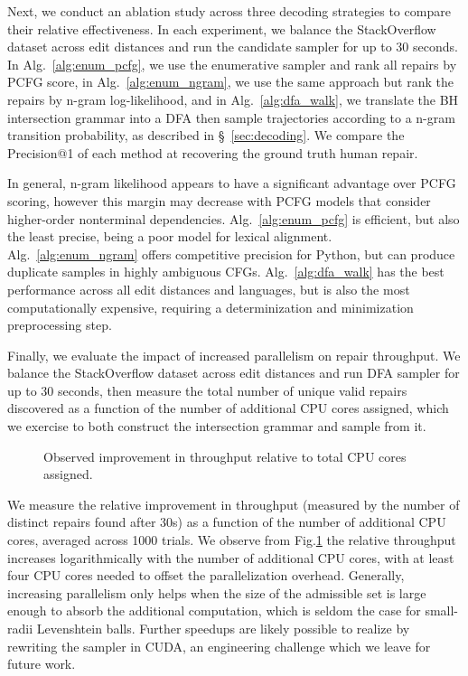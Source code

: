 \documentclass[sigplan,acmsmall,nonacm,screen]{acmart}\settopmatter{printfolios=false,printccs=false,printacmref=false}
\begin{document}
  Next, we conduct an ablation study across three decoding strategies to compare their relative effectiveness. In each experiment, we balance the StackOverflow dataset across edit distances and run the candidate sampler for up to 30 seconds. In Alg.~\ref{alg:enum_pcfg}, we use the enumerative sampler and rank all repairs by PCFG score, in Alg.~\ref{alg:enum_ngram}, we use the same approach but rank the repairs by n-gram log-likelihood, and in Alg.~\ref{alg:dfa_walk}, we translate the BH intersection grammar into a DFA then sample trajectories according to a n-gram transition probability, as described in \S~\ref{sec:decoding}. We compare the Precision@1 of each method at recovering the ground truth human repair.

  \begin{figure}[h]
    
    
    
  \end{figure}

  In general, n-gram likelihood appears to have a significant advantage over PCFG scoring, however this margin may decrease with PCFG models that consider higher-order nonterminal dependencies. Alg.~\ref{alg:enum_pcfg} is efficient, but also the least precise, being a poor model for lexical alignment. Alg.~\ref{alg:enum_ngram} offers competitive precision for Python, but can produce duplicate samples in highly ambiguous CFGs. Alg.~\ref{alg:dfa_walk} has the best performance across all edit distances and languages, but is also the most computationally expensive, requiring a determinization and minimization preprocessing step.

Finally, we evaluate the impact of increased parallelism on repair throughput. We balance the StackOverflow dataset across edit distances and run DFA sampler for up to 30 seconds, then measure the total number of unique valid repairs discovered as a function of the number of additional CPU cores assigned, which we exercise to both construct the intersection grammar and sample from it.

  \begin{figure}
    
    \caption{Observed improvement in throughput relative to total CPU cores assigned.}
    \label{fig:speedup}
  \end{figure}

  We measure the relative improvement in throughput (measured by the number of distinct repairs found after 30s) as a function of the number of additional CPU cores, averaged across 1000 trials. We observe from Fig.\ref{fig:speedup} the relative throughput increases logarithmically with the number of additional CPU cores, with at least four CPU cores needed to offset the parallelization overhead. Generally, increasing parallelism only helps when the size of the admissible set is large enough to absorb the additional computation, which is seldom the case for small-radii Levenshtein balls. Further speedups are likely possible to realize by rewriting the sampler in CUDA, an engineering challenge which we leave for future work.
\end{document}
